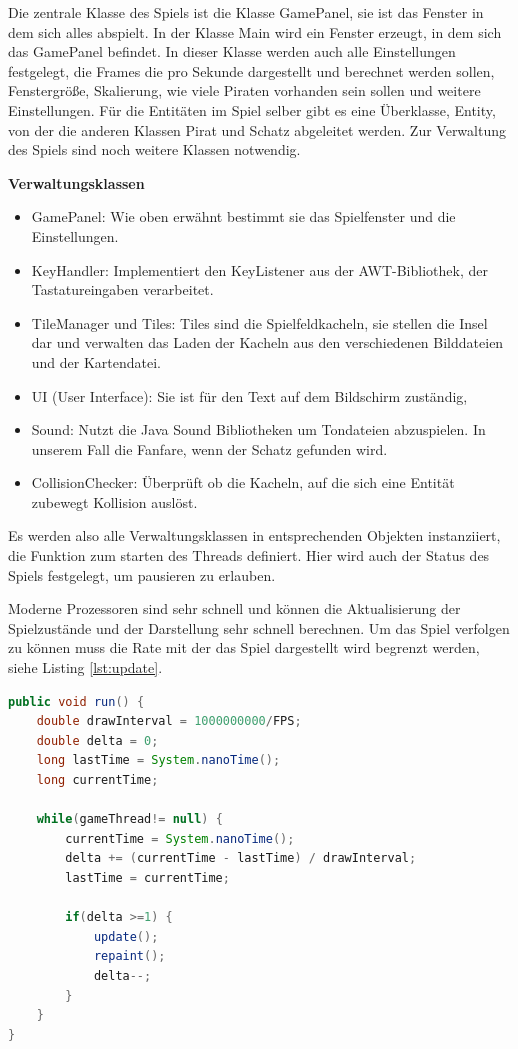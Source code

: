 \documentclass[
	12pt, %
	a4paper,
	listof=totoc, %
	bibliography=totoc, %
	numbers=noenddot, %
	ngerman, %
	headsepline, %
	oneside %
	]{scrbook} %
\begin{document}
Die zentrale Klasse des Spiels ist die Klasse GamePanel, sie ist das Fenster in dem sich alles abspielt. In der Klasse Main wird ein Fenster erzeugt, in dem sich das GamePanel befindet. In dieser Klasse werden auch alle Einstellungen festgelegt, die Frames die pro Sekunde dargestellt und berechnet werden sollen, Fenstergröße, Skalierung, wie viele Piraten vorhanden sein sollen und weitere Einstellungen.  
Für die Entitäten im Spiel selber gibt es eine Überklasse, Entity, von der die anderen Klassen Pirat und Schatz abgeleitet werden.  
Zur Verwaltung des Spiels sind noch weitere Klassen notwendig.

\textbf{Verwaltungsklassen}
\begin{itemize}\vspace{-1em}
\setlength{\itemsep}{-1em}
	\item GamePanel: Wie oben erwähnt bestimmt sie das Spielfenster und die Einstellungen.
	\item KeyHandler: Implementiert den KeyListener aus der AWT-Bibliothek, der Tastatureingaben verarbeitet.
	\item TileManager und Tiles: Tiles sind die Spielfeldkacheln, sie stellen die Insel dar und verwalten das Laden der Kacheln aus den verschiedenen Bilddateien und der Kartendatei.
	\item UI (User Interface): Sie ist für den Text auf dem Bildschirm zuständig,
	\item Sound: Nutzt die Java Sound Bibliotheken um Tondateien abzuspielen. In unserem Fall die Fanfare, wenn der Schatz gefunden wird.
	\item CollisionChecker: Überprüft ob die Kacheln, auf die sich eine Entität zubewegt Kollision auslöst.
\end{itemize}

Es werden also alle Verwaltungsklassen in entsprechenden Objekten instanziiert, die Funktion zum starten des Threads definiert. Hier wird auch der Status des Spiels festgelegt, um pausieren zu erlauben.

Moderne Prozessoren sind sehr schnell und können die Aktualisierung der Spielzustände und der Darstellung sehr schnell berechnen. Um das Spiel verfolgen zu können muss die Rate mit der das Spiel dargestellt wird begrenzt werden, siehe Listing \ref{lst:update}.

\begin{lstlisting}[language=Java, caption=Beschränkung der Aktualisierungen, label={lst:update}]
public void run() {
	double drawInterval = 1000000000/FPS;
	double delta = 0;
	long lastTime = System.nanoTime();
	long currentTime;
	
	while(gameThread!= null) {
		currentTime = System.nanoTime();
		delta += (currentTime - lastTime) / drawInterval;
		lastTime = currentTime;
		
		if(delta >=1) {
			update();
			repaint();
			delta--;
		}
	}
}
\end{lstlisting}
\end{document}
